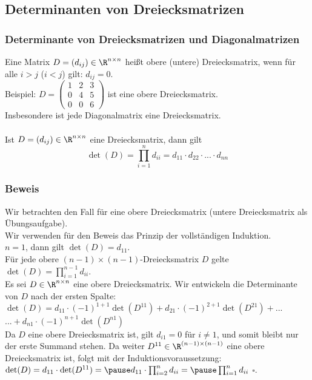 \subsection{Determinanten von Dreiecksmatrizen}
%
\begin{frame}\frametitle{Determinante von Dreiecksmatrizen und Diagonalmatrizen}
Eine Matrix $D =(d_{ij})\in \R^{n\times n}$ heißt obere (untere) Dreiecksmatrix, wenn für alle $i>j$ ($i<j$) gilt: $d_{ij}=0$.\\\pause
Beispiel: $D=\begin{pmatrix} 1 & 2 & 3 \\ 0 & 4 & 5 \\ 0&0&6 \end{pmatrix}$ ist eine obere Dreiecksmatrix. \\\vfill
Insbesondere ist jede Diagonalmatrix eine Dreiecksmatrix.\\
\vfill \pause
{}\\
Ist $D=(d_{ij}) \in \R^{n\times n}$ eine Dreiecksmatrix, dann gilt
$$
\det(D)=\prod_{i=1}^n d_{ii} = d_{11} \cdot d_{22} \cdot ... \cdot d_{nn}
$$
\end{frame}
%
%
\begin{frame}\frametitle{Beweis}
Wir betrachten den Fall für eine obere Dreiecksmatrix (untere Dreiecksmatrix als Übungsaufgabe).\\\pause
Wir verwenden für den Beweis das Prinzip der vollständigen Induktion.\\\pause
{} $n=1$, dann gilt $\det(D)=d_{11}$.\\\pause
{} Für jede obere $(n-1)\times(n-1)$-Dreiecksmatrix $D$ gelte $\det(D)=\prod_{i=1}^{n-1} d_{ii}$.\\\pause
{} Es sei $D \in \R^{n\times n}$ eine obere Dreiecksmatrix. Wir entwickeln die Determinante von $D$ nach der ersten Spalte:\\\pause
$\det(D)=d_{11}\cdot(-1)^{1+1}\det(D^{11})+d_{21}\cdot(-1)^{2+1}\det(D^{21})+...$\\
\hspace{15mm}$...+d_{n1}\cdot(-1)^{n+1}\det(D^{n1})$\\\pause
Da $D$ eine obere Dreiecksmatrix ist, gilt $d_{i1}=0$ für $i\ne1$, und somit bleibt nur der erste Summand stehen. Da weiter $D^{11}\in\R^{(n-1)\times(n-1)}$ eine obere Dreiecksmatrix ist, folgt mit der Induktionsvoraussetzung:\\\pause
$\det(D)=d_{11}\cdot \det(D^{11})=\pause d_{11}\cdot \prod_{i=2}^n d_{ii}= \pause \prod_{i=1}^n d_{ii}$ \hfill $\square$.
 

\end{frame}
%
